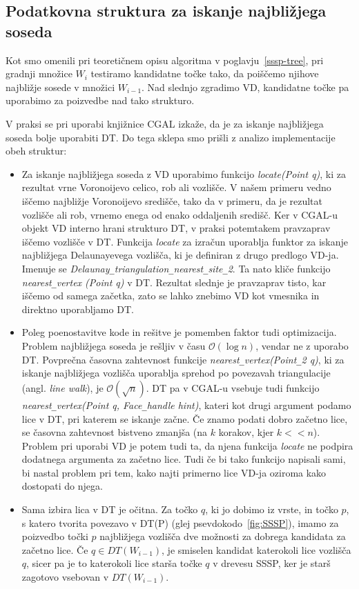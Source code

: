 \documentclass[a4paper, 12pt]{book}
\newcommand{\OO}{\ensuremath{\mathcal{O}}} %
\newcommand{\U}{\texttt{\_}}
\begin{document}
\subsection{Podatkovna struktura za iskanje najbližjega soseda}
\label{why dt}

Kot smo omenili pri teoretičnem opisu algoritma v poglavju~\ref{sssp-tree}, pri gradnji množice $W_i$ testiramo kandidatne točke tako, da poiščemo njihove najbližje sosede v množici $W_{i-1}$. Nad slednjo zgradimo VD, kandidatne točke pa uporabimo za poizvedbe nad tako strukturo.

V praksi se pri uporabi knjižnice CGAL izkaže, da je za iskanje najbližjega soseda bolje uporabiti DT. Do tega sklepa smo prišli z analizo implementacije obeh struktur:

\begin{itemize}
\item Za iskanje najbližjega soseda z VD uporabimo funkcijo \textit{locate(Point q)}, ki za rezultat vrne Voronoijevo celico, rob ali vozlišče. V našem primeru vedno iščemo najbližje Voronoijevo središče, tako da v primeru, da je rezultat vozlišče ali rob, vrnemo enega od enako oddaljenih središč. Ker v CGAL-u objekt VD interno hrani strukturo DT, v praksi potemtakem pravzaprav iščemo vozlišče v DT. Funkcija \textit{locate} za izračun uporablja funktor za iskanje najbližjega Delaunayevega vozlišča, ki je definiran z drugo predlogo VD-ja. Imenuje se \textit{Delaunay\U triangulation\U nearest\U site\U 2}. Ta nato kliče funkcijo \textit{nearest\U vertex (Point q)} v DT. Rezultat slednje je pravzaprav tisto, kar iščemo od samega začetka, zato se lahko znebimo VD kot vmesnika in direktno uporabljamo DT.
\item Poleg poenostavitve kode in rešitve je pomemben faktor tudi optimizacija. Problem najbližjega soseda je rešljiv v času $\OO(\log n)$, vendar ne z uporabo DT. Povprečna časovna zahtevnost funkcije \textit{nearest\U vertex(Point\U 2 q)}, ki za iskanje najbližjega vozlišča uporablja sprehod po povezavah triangulacije (angl. \textit{line walk}), je $\OO(\sqrt{n})$. DT pa v CGAL-u vsebuje tudi funkcijo \textit{nearest\U vertex(Point q, Face\U handle hint)}, kateri kot drugi argument podamo lice v DT, pri katerem se iskanje začne. Če znamo podati dobro začetno lice, se časovna zahtevnost bistveno zmanjša (na $k$ korakov, kjer $k << n$). Problem pri uporabi VD je potem tudi ta, da njena funkcija \textit{locate} ne podpira dodatnega argumenta za začetno lice. Tudi če bi tako funkcijo napisali sami, bi nastal problem pri tem, kako najti primerno lice VD-ja oziroma kako dostopati do njega. 
\item Sama izbira lica v DT je očitna. Za točko $q$, ki jo dobimo iz vrste, in točko $p$, s katero tvorita povezavo v DT(P) (glej psevdokodo~\ref{fig:SSSP}), imamo za poizvedbo točki $p$ najbližjega vozlišča dve možnosti za dobrega kandidata za začetno lice. Če $q\in DT(W_{i-1})$, je smiselen kandidat katerokoli lice vozlišča $q$, sicer pa je to katerokoli lice starša točke $q$ v drevesu SSSP, ker je starš zagotovo vsebovan v $DT(W_{i-1})$. 
\end{itemize}
\end{document}
